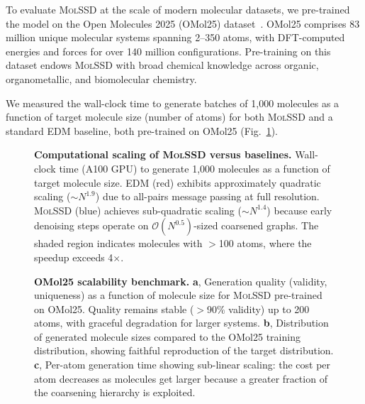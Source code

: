 \documentclass[11pt]{article}
\newcommand{\molssd}{\textsc{MolSSD}}
\begin{document}
To evaluate \molssd{} at the scale of modern molecular datasets, we pre-trained the model on the Open Molecules 2025 (OMol25) dataset~\cite{omol25}. OMol25 comprises 83 million unique molecular systems spanning 2--350 atoms, with DFT-computed energies and forces for over 140 million configurations. Pre-training on this dataset endows \molssd{} with broad chemical knowledge across organic, organometallic, and biomolecular chemistry.

We measured the wall-clock time to generate batches of 1{,}000 molecules as a function of target molecule size (number of atoms) for both \molssd{} and a standard EDM baseline, both pre-trained on OMol25 (Fig.~\ref{fig:scaling}).

\begin{figure}[t]
    \centering
    \caption{\textbf{Computational scaling of \molssd{} versus baselines.} Wall-clock time (A100 GPU) to generate 1{,}000 molecules as a function of target molecule size. EDM (red) exhibits approximately quadratic scaling ($\sim N^{1.9}$) due to all-pairs message passing at full resolution. \molssd{} (blue) achieves sub-quadratic scaling ($\sim N^{1.4}$) because early denoising steps operate on $\mathcal{O}(N^{0.5})$-sized coarsened graphs. The shaded region indicates molecules with $>$100 atoms, where the speedup exceeds 4$\times$.}
    \label{fig:scaling}
\end{figure}

\begin{figure}[t]
    \centering
    \caption{\textbf{OMol25 scalability benchmark.} \textbf{a}, Generation quality (validity, uniqueness) as a function of molecule size for \molssd{} pre-trained on OMol25. Quality remains stable ($>$90\% validity) up to 200 atoms, with graceful degradation for larger systems. \textbf{b}, Distribution of generated molecule sizes compared to the OMol25 training distribution, showing faithful reproduction of the target distribution. \textbf{c}, Per-atom generation time showing sub-linear scaling: the cost per atom decreases as molecules get larger because a greater fraction of the coarsening hierarchy is exploited.}
    \label{fig:omol25}
\end{figure}
\end{document}
